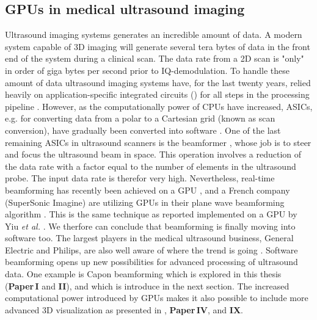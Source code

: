 
\subsection{GPUs in medical ultrasound imaging}
Ultrasound imaging systems generates an incredible amount of data. A modern system capable of 3D imaging will generate several tera bytes of data in the front end of the system during a clinical scan. The data rate from a 2D scan is "only" in order of giga bytes per second prior to IQ-demodulation. To handle these amount of data ultrasound imaging systems have, for the last twenty years, relied heavily on application-specific integrated circuits () for all steps in the processing pipeline \cite{Thomenius}. However, as the computationally power of CPUs have increased, ASICs, e.g. for converting data from a polar to a Cartesian grid (known as scan conversion), have gradually been converted into software \cite{Guracar2013}. One of  the last remaining ASICs in ultrasound scanners is the beamformer \cite{Thomenius}, whose job is to steer and focus the ultrasound beam in space. This operation involves a reduction of the data rate with a factor equal to the number of elements in the ultrasound probe. The input data rate is therefor very high. Nevertheless, real-time beamforming has recently been achieved on a GPU \cite{Song2012}, and a French company (SuperSonic Imagine) are utilizing GPUs in their plane wave beamforming algorithm \cite{Tanter2014}. This is the same technique as reported implemented on a GPU by Yiu \textit{et al.} \cite{Yiu2011}. We therfore can conclude that beamforming is finally moving into software too. The largest players in the medical ultrasound business, General Electric and Philips, are also well aware of where the trend is going \cite{Thomenius2012} \cite{Metz2011}. Software beamforming opens up new possibilities for advanced processing of ultrasound data. One example is Capon beamforming which is explored in this thesis (\textbf{Paper\,I} and \textbf{II}), and which is introduce in the next section. The increased computational power introduced by GPUs makes it also possible to include more advanced 3D visualization as presented in \cite{solteszova2010multidirectional}, \textbf{Paper\,IV}, and \textbf{IX}.

